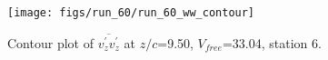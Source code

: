 \begin{figure}[H]
\centering
\texttt{[image: figs/run\_60/run\_60\_ww\_contour]}
\caption{Contour plot of $\overline{v_{z}^{\prime} v_{z}^{\prime}}$ at $z/c$=9.50, $V_{free}$=33.04, station 6.}
\label{fig:run_60_ww_contour}
\end{figure}


